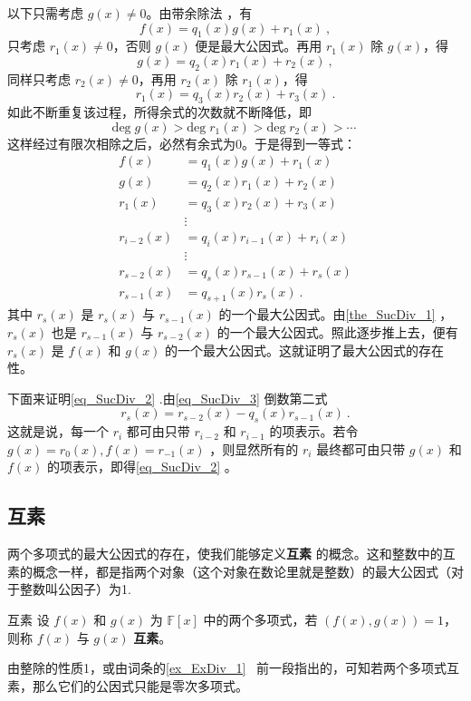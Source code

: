 以下只需考虑 $g(x)\neq 0$。由带余除法 ，有
\begin{equation}
f(x)=q_1(x)g(x)+r_1(x)~,
\end{equation}
只考虑 $r_1(x)\neq 0$，否则 $g(x)$ 便是最大公因式。再用 $r_1(x)$ 除 $g(x)$，得
\begin{equation}
g(x)=q_2(x)r_1(x)+r_2(x)~,
\end{equation}
同样只考虑 $r_2(x)\neq0$，再用 $r_2(x)$ 除 $r_1(x)$，得
\begin{equation}
r_1(x)=q_3(x)r_2(x)+r_3(x)~.
\end{equation}
如此不断重复该过程，所得余式的次数就不断降低，即
\begin{equation}
\mathrm{deg}\;g(x)>\mathrm{deg}\;r_1(x)>\mathrm{deg}\;r_2(x)>\cdots~
\end{equation}
这样经过有限次相除之后，必然有余式为0。于是得到一等式：
\begin{equation}\label{eq_SucDiv_3}
\begin{aligned}
f(x)&=q_1(x)g(x)+r_1(x)\\
g(x)&=q_2(x)r_1(x)+r_2(x)\\
r_1(x)&=q_3(x)r_2(x)+r_3(x)\\
&\vdots\\
r_{i-2}(x)&=q_i(x)r_{i-1}(x)+r_i(x)\\
&\vdots\\
r_{s-2}(x)&=q_s(x)r_{s-1}(x)+r_s(x)\\
r_{s-1}(x)&=q_{s+1}(x)r_s(x)~.
\end{aligned}
\end{equation}
其中 $r_s(x)$ 是 $r_s(x)$ 与 $r_{s-1}(x)$ 的一个最大公因式。由\autoref{the_SucDiv_1} ，$r_s(x)$ 也是 $r_{s-1}(x)$ 与 $r_{s-2}(x)$ 的一个最大公因式。照此逐步推上去，便有 $r_s(x)$ 是 $f(x)$ 和 $g(x)$ 的一个最大公因式。这就证明了最大公因式的存在性。

下面来证明\autoref{eq_SucDiv_2} .由\autoref{eq_SucDiv_3} 倒数第二式
\begin{equation}
r_s(x)=r_{s-2}(x)-q_s(x)r_{s-1}(x)~.
\end{equation}
这就是说，每一个 $r_i$ 都可由只带 $r_{i-2}$ 和 $r_{i-1}$ 的项表示。若令 $g(x)=r_0(x),f(x)=r_{-1}(x)$ ，则显然所有的 $r_i$ 最终都可由只带 $g(x)$ 和 $f(x)$ 的项表示，即得\autoref{eq_SucDiv_2} 。
\subsection{互素}
两个多项式的最大公因式的存在，使我们能够定义\textbf{互素} 的概念。这和整数中的互素的概念一样，都是指两个对象（这个对象在数论里就是整数）的最大公因式（对于整数叫公因子）为1.
\begin{definition}{互素}
设 $f(x)$ 和 $g(x)$ 为 $\mathbb{F}[x]$ 中的两个多项式，若 $(f(x),g(x))=1$，则称 $f(x)$ 与 $g(x)$ \textbf{互素}。
\end{definition}
由整除的性质1，或由词条的\autoref{ex_ExDiv_1}~ 前一段指出的，可知若两个多项式互素，那么它们的公因式只能是零次多项式。

